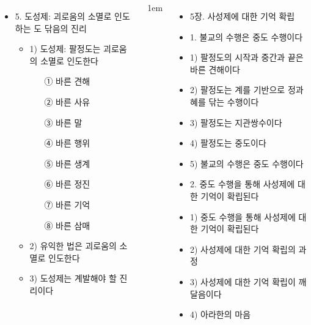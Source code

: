 \documentclass[	14pt, 
							a1paper, 
							portrait, %
							margin=0mm, %
							innermargin=10mm,  		%
							colspace=5mm, 
							subcolspace=0mm
							]{tikzposter}
\begin{document}
\begin{columns}
{\begin{itemize}
					\item 5. 도성제: 괴로움의 소멸로 인도하는 도 닦음의 진리
						\begin{itemize}
						\item 1) 도성제: 팔정도는 괴로움의 소멸로 인도한다
							\begin{itemize}
							\item [①] 바른 견해
							\item [②] 바른 사유
							\item [③] 바른 말
							\item [④] 바른 행위
							\item [⑤] 바른 생계
							\item [⑥] 바른 정진
							\item [⑦] 바른 기억
							\item [⑧] 바른 삼매
							\end{itemize}
						\item 2) 유익한 법은 괴로움의 소멸로 인도한다
						\item 3) 도성제는 계발해야 할 진리이다
						\end{itemize}

					\end{itemize}
			}





			{
					\setlength{\leftmargini}{2em}
					\setlength{\labelsep} {1em}
					\begin{itemize}
					\item 5장. 사성제에 대한 기억 확립

					\item 1. 불교의 수행은 중도 수행이다
					\item 1) 팔정도의 시작과 중간과 끝은 바른 견해이다
					\item 2) 팔정도는 계를 기반으로 정과 혜를 닦는 수행이다
					\item 3) 팔정도는 지관쌍수이다
					\item 4) 팔정도는 중도이다
					\item 5) 불교의 수행은 중도 수행이다

					\item 2. 중도 수행을 통해 사성제에 대한 기억이 확립된다
					\item 1) 중도 수행을 통해 사성제에 대한 기억이 확립된다
					\item 2) 사성제에 대한 기억 확립의 과정
					\item 3) 사성제에 대한 기억 확립이 깨달음이다
					\item 4) 아라한의 마음


\end{itemize}}
\end{columns}
\end{document}
